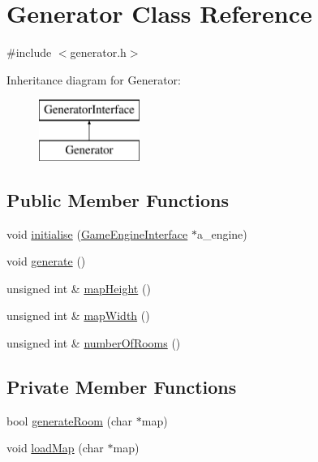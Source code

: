\hypertarget{classGenerator}{\section{Generator Class Reference}
\label{classGenerator}
}


{\ttfamily \#include $<$generator.\-h$>$}

Inheritance diagram for Generator\-:\begin{figure}[H]
\begin{center}
\leavevmode
\includegraphics[height=2.000000cm]{classGenerator}
\end{center}
\end{figure}
\subsection*{Public Member Functions}
\begin{DoxyCompactItemize}
\item 
void \hyperlink{classGenerator_a3f690e7b3bb96571346bb51ca2adbe11}{initialise} (\hyperlink{classGameEngineInterface}{Game\-Engine\-Interface} $\ast$a\-\_\-engine)
\item 
void \hyperlink{classGenerator_a16cdfb04efdcc06650b99b2121d1b9b9}{generate} ()
\item 
unsigned int \& \hyperlink{classGenerator_adddb6dfba9dbda6ea3fd9d08ff250bde}{map\-Height} ()
\item 
unsigned int \& \hyperlink{classGenerator_a6558f2a519d5b8e67ecc3a6620a7fb5f}{map\-Width} ()
\item 
unsigned int \& \hyperlink{classGenerator_a9c3012dc9e8788ffd1014a6511238be2}{number\-Of\-Rooms} ()
\end{DoxyCompactItemize}
\subsection*{Private Member Functions}
\begin{DoxyCompactItemize}
\item 
bool \hyperlink{classGenerator_a5f40352b20fe2c4534523e18121cb0e6}{generate\-Room} (char $\ast$map)
\item 
void \hyperlink{classGenerator_a9daa14b13068fbe9efb1d14f55f629d1}{load\-Map} (char $\ast$map)
\end{DoxyCompactItemize}
